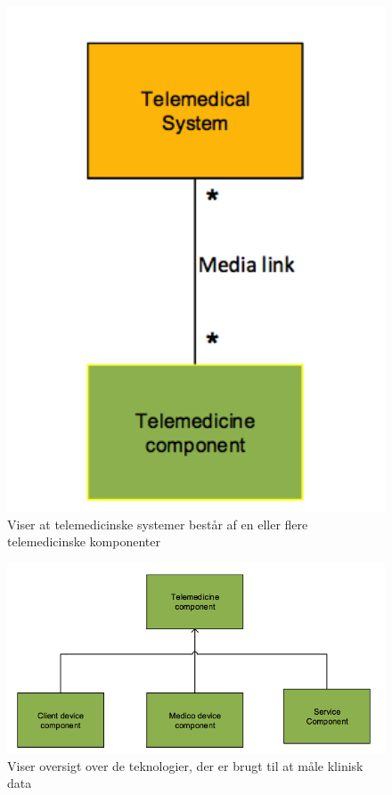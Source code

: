 \begin{figure}[H]
	\centering
	\includegraphics[width=1\textwidth]{Figurer/Snip20160504_29}
	\caption{Viser at telemedicinske systemer består af en eller flere telemedicinske komponenter}
\end{figure}

\begin{figure}[H]
	\centering
	\includegraphics[width=1\textwidth]{Figurer/Snip20160504_30}
	\caption{Viser oversigt over de teknologier, der er brugt til at måle klinisk data}
\end{figure}

